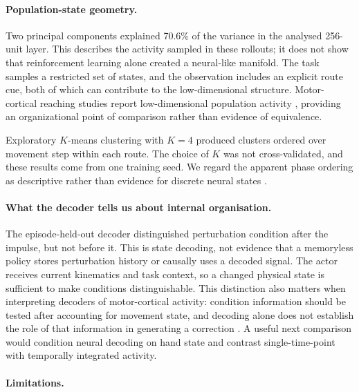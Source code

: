 \documentclass{article}
\begin{document}
\paragraph{Population-state geometry.}

Two principal components explained 70.6\% of the variance in the analysed
256-unit layer. This describes the activity sampled in these rollouts; it
does not show that reinforcement learning alone created a neural-like
manifold. The task samples a restricted set of states, and the observation
includes an explicit route cue, both of which can contribute to the
low-dimensional structure. Motor-cortical reaching studies report
low-dimensional population activity
\citep{Churchland2012,Shenoy2013,Cunningham2014,Gallego2017}, providing an
organizational point of comparison rather than evidence of equivalence.

Exploratory $K$-means clustering with $K=4$ produced clusters ordered over
movement step within each route. The choice of $K$ was not cross-validated,
and these results come from one training seed. We regard the apparent
phase ordering as descriptive rather than evidence for discrete neural
states \citep{Churchland2012,Shenoy2013,Kaufman2014,Elsayed2016,Georgopoulos1986}.

\paragraph{What the decoder tells us about internal organisation.}

The episode-held-out decoder distinguished perturbation condition after
the impulse, but not before it. This is state decoding, not evidence that a
memoryless policy stores perturbation history or causally uses a decoded
signal. The actor receives current kinematics and task context, so a
changed physical state is sufficient to make conditions distinguishable.
This distinction also matters when interpreting decoders of
motor-cortical activity: condition information should be tested after
accounting for movement state, and decoding alone does not establish the
role of that information in generating a correction
\citep{Nashed2014,Churchland2012,Sadtler2014,Perich2018}.
A useful next comparison would condition neural decoding on hand state and
contrast single-time-point with temporally integrated activity.

\paragraph{Limitations.}
\end{document}
